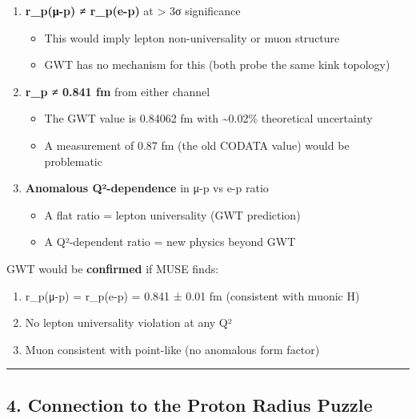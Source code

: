 \documentclass[
]{article}
\providecommand{\tightlist}{%
  \setlength{\itemsep}{0pt}\setlength{\parskip}{0pt}}
\begin{document}
\begin{enumerate}
\def\labelenumi{\arabic{enumi}.}
\tightlist
\item
  \textbf{r\_p(μ-p) ≠ r\_p(e-p)} at \textgreater{} 3σ significance

  \begin{itemize}
  \tightlist
  \item
    This would imply lepton non-universality or muon structure
  \item
    GWT has no mechanism for this (both probe the same kink topology)
  \end{itemize}
\item
  \textbf{r\_p ≠ 0.841 fm} from either channel

  \begin{itemize}
  \tightlist
  \item
    The GWT value is 0.84062 fm with \textasciitilde0.02\% theoretical
    uncertainty
  \item
    A measurement of 0.87 fm (the old CODATA value) would be problematic
  \end{itemize}
\item
  \textbf{Anomalous Q²-dependence} in μ-p vs e-p ratio

  \begin{itemize}
  \tightlist
  \item
    A flat ratio = lepton universality (GWT prediction)
  \item
    A Q²-dependent ratio = new physics beyond GWT
  \end{itemize}
\end{enumerate}

GWT would be \textbf{confirmed} if MUSE finds:

\begin{enumerate}
\def\labelenumi{\arabic{enumi}.}
\tightlist
\item
  r\_p(μ-p) = r\_p(e-p) = 0.841 ± 0.01 fm (consistent with muonic H)
\item
  No lepton universality violation at any Q²
\item
  Muon consistent with point-like (no anomalous form factor)
\end{enumerate}

\begin{center}\rule{0.5\linewidth}{0.5pt}\end{center}

\subsection{4. Connection to the Proton Radius
Puzzle}\label{connection-to-the-proton-radius-puzzle}
\end{document}
